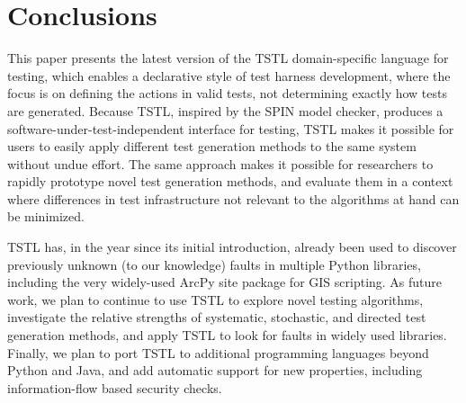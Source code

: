 \section{Conclusions}
\label{conclusion}

This paper presents the latest version of the TSTL
\cite{NFM15,ISSTA15,tstl} domain-specific language for testing, which
enables a declarative style of test harness development, where the
focus is on defining the actions in valid tests, not determining
exactly how tests are generated.  Because TSTL, inspired by the SPIN
model checker, produces a software-under-test-independent interface
for testing, TSTL makes it possible for users to easily apply
different test generation methods to the same system without undue
effort.  The same approach makes it possible for researchers to rapidly prototype novel test generation
methods, and evaluate them in a context where differences in test
infrastructure not relevant to the algorithms at hand can be minimized.

TSTL has, in the year since its initial introduction,
already been used to discover previously unknown (to our knowledge)
faults in multiple Python libraries, including the very widely-used
ArcPy site package for GIS scripting. 
As future work, we plan to continue to use TSTL to explore novel
testing algorithms, investigate the relative strengths of systematic,
stochastic, and directed test generation methods, and apply TSTL to
look for faults in widely used libraries.  Finally, we plan to
port TSTL to additional
programming languages beyond Python and Java, and add automatic
support for new properties, including
information-flow based security checks.
